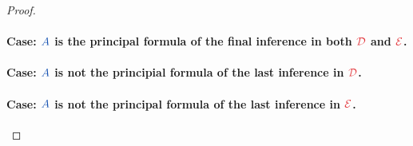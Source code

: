 \begin{proof}
  \paragraph{Case: $\prp{A}$ is the principal formula of the final inference
  in both $\drv{D}$ and $\drv{E}$.}\quad

  \paragraph{Case: $\prp{A}$ is not the principial formula of the last
  inference in $\drv{D}$.}\quad

  \paragraph{Case: $\prp{A}$ is not the principal formula of the last
  inference in $\drv{E}$.}\quad

\end{proof}




